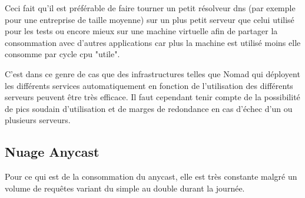 Ceci fait qu'il est préférable de faire tourner un petit résolveur dns (par exemple pour une entreprise de taille moyenne) sur un plus petit serveur que celui utilisé pour les tests ou encore mieux sur une machine virtuelle afin de partager la consommation avec d'autres applications car plus la machine est utilisé moins elle consomme par cycle cpu "utile".

C'est dans ce genre de cas que des infrastructures telles que Nomad qui déployent les différents services automatiquement en fonction de l'utilisation des différents serveurs peuvent être très efficace.
Il faut cependant tenir compte de la possibilité de pics soudain d'utilisation et de marges de redondance en cas d'échec d'un ou plusieurs serveurs.

\subsection{Nuage Anycast}
Pour ce qui est de la consommation du \gls{anycast}, elle est très constante malgré un volume de requêtes variant du simple au double durant la journée.

